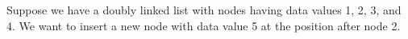 \documentclass[preview]{standalone}
\begin{document}
Suppose we have a doubly linked list with nodes having data values 1, 2, 3, and 4. We want to insert a new node with data value 5 at the position after node 2.\\
\end{document}
